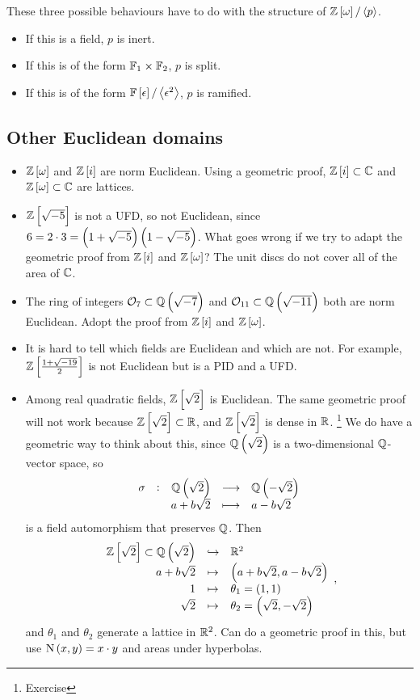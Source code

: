 \begin{remark*}
These three possible behaviours have to do with the structure of $ \ZZ\sbr{\omega} / \abr{p} $.
\begin{itemize}
\item If this is a field, $ p $ is inert.
\item If this is of the form $ \mathbb{F}_1 \times \mathbb{F}_2 $, $ p $ is split.
\item If this is of the form $ \FF\sbr{\epsilon} / \abr{\epsilon^2} $, $ p $ is ramified.
\end{itemize}
\end{remark*}

\subsection{Other Euclidean domains}

\begin{itemize}
\item $ \ZZ\sbr{\omega} $ and $ \ZZ\sbr{i} $ are norm Euclidean. Using a geometric proof, $ \ZZ\sbr{i} \subset \CC $ and $ \ZZ\sbr{\omega} \subset \CC $ are lattices.
\item $ \ZZ\sbr{\sqrt{-5}} $ is not a UFD, so not Euclidean, since $ 6 = 2 \cdot 3 = \br{1 + \sqrt{-5}}\br{1 - \sqrt{-5}} $. What goes wrong if we try to adapt the geometric proof from $ \ZZ\sbr{i} $ and $ \ZZ\sbr{\omega} $? The unit discs do not cover all of the area of $ \mathbb{C} $.
\item The ring of integers $ \OOO_7 \subset \QQ\br{\sqrt{-7}} $ and $ \OOO_{11} \subset \QQ\br{\sqrt{-11}} $ both are norm Euclidean. Adopt the proof from $ \ZZ\sbr{i} $ and $ \ZZ\sbr{\omega} $.
\item It is hard to tell which fields are Euclidean and which are not. For example, $ \ZZ\sbr{\tfrac{1 + \sqrt{-19}}{2}} $ is not Euclidean but is a PID and a UFD.
\item Among real quadratic fields, $ \ZZ\sbr{\sqrt{2}} $ is Euclidean. The same geometric proof will not work because $ \ZZ\sbr{\sqrt{2}} \subset \RR $, and $ \ZZ\sbr{\sqrt{2}} $ is dense in $ \mathbb{R} $. \footnote{Exercise} We do have a geometric way to think about this, since $ \QQ\br{\sqrt{2}} $ is a two-dimensional $ \mathbb{Q} $-vector space, so
$$ \function[\sigma]{\QQ\br{\sqrt{2}}}{\QQ\br{-\sqrt{2}}}{a + b\sqrt{2}}{a - b\sqrt{2}} $$
is a field automorphism that preserves $ \mathbb{Q} $. Then
$$
\begin{array}{rcl}
\ZZ\sbr{\sqrt{2}} \subset \QQ\br{\sqrt{2}} & \hookrightarrow & \RR^2 \\
a + b\sqrt{2} & \mapsto & \br{a + b\sqrt{2}, a - b\sqrt{2}} \\
1 & \mapsto & \theta_1 = \br{1, 1} \\
\sqrt{2} & \mapsto & \theta_2 = \br{\sqrt{2}, -\sqrt{2}}
\end{array},
$$
and $ \theta_1 $ and $ \theta_2 $ generate a lattice in $ \mathbb{R}^2 $. Can do a geometric proof in this, but use $ \N\br{x, y} = x \cdot y $ and areas under hyperbolas.
\end{itemize}

